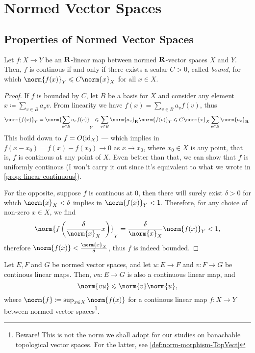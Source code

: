 \section{Normed Vector Spaces}


\subsection{Properties of Normed Vector Spaces}

\begin{proposition}
\label{prop:continous-linear-thus-bounded}
Let \(f: X \to Y\) be an \(\mathbf{R}\)-linear map between normed \(\mathbf{R}\)-vector spaces
\(X\) and \(Y\). Then, \(f\) is continous if and only if there exists a scalar
\(C > 0\), called \emph{bound}, for which \(\norm{f(x)}_Y \leq C \norm{x}_{X}\)
for all \(x \in X\).
\end{proposition}

\begin{proof}
If \(f\) is bounded by \(C\), let \(B\) be a basis for \(X\) and consider any
element \(x \coloneq \sum_{v \in B} a_{v} v\). From linearity we have \(f(x) =
\sum_{v \in B} a_v f(v)\), thus
\[
  \norm{f(x)}_Y = \norm{\sum_{v \in B} a_v f(v)}_{Y}
  \leq \sum_{v \in B} \norm{a_v}_{\R} \norm{f(v)}_{Y}
  \leq C \norm{x}_{X} \sum_{v \in B} \norm{a_v}_{\R}.
\]
This boild down to \(f = O(\operatorname{id}_{X})\) --- which implies in \(f(x - x_0) = f(x) -
f(x_0) \to 0\) as \(x \to x_0\), where \(x_0 \in X\) is any point, that is,
\(f\) is continous at any point of \(X\). Even better than that, we can show
that \(f\) is uniformly continous (I won't carry it out since it's equivalent to
what we wrote in \cref{prop: linear-continuous}).

For the opposite, suppose \(f\) is continous at \(0\), then there will surely
exist \(\delta > 0\) for which \(\norm{x}_X < \delta\) implies in
\(\norm{f(x)}_Y < 1\). Therefore, for any choice of non-zero \(x \in X\), we
find
\[
  \norm{f\left( \frac{\delta}{\norm{x}_X} x \right)}_Y
  = \frac{\delta}{\norm{x}_X} \norm{f(x)}_{Y} < 1,
\]
therefore \(\norm{f(x)} < \frac{\norm{x}_{X}}{\delta}\), thus \(f\) is indeed
bounded.
\end{proof}

\begin{proposition}
\label{prop:composition-banach-morphisms}
Let \(E, F\) and \(G\) be normed vector spaces, and let \(u: E \to F\) and \(v:
F \to G\) be continous linear maps. Then, \(v u: E \to G\) is also a continuous
linear map, and
\[
  \norm{v u} \leq \norm{v} \norm{u},
\]
where \(\norm{f} \coloneq \sup_{x \in X} \norm{f(x)}\) for a continous linear
map \(f: X \to Y\) between normed vector spaces\footnote{Beware! This is not the
norm we shall adopt for our studies on banachable topological vector spaces. For
the latter, see \cref{def:norm-morphism-TopVect}}.
\end{proposition}

